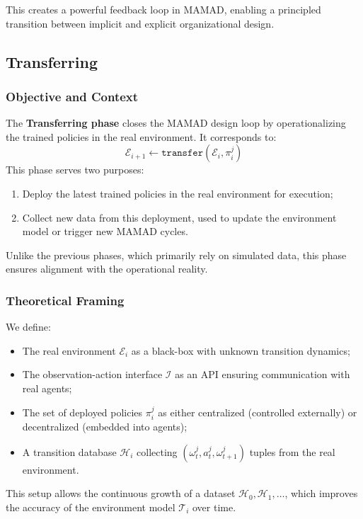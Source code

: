 \documentclass[pdflatex,sn-mathphys-num]{sn-jnl}%
\theoremstyle{thmstyleone}%
\theoremstyle{thmstyletwo}%
\theoremstyle{thmstylethree}%
\begin{document}
This creates a powerful feedback loop in MAMAD, enabling a principled transition between implicit and explicit organizational design.


\subsection{Transferring}

\subsubsection*{Objective and Context}

The \textbf{Transferring phase} closes the MAMAD design loop by operationalizing the trained policies in the real environment. It corresponds to:
\[
\mathcal{E}_{i+1} \gets \texttt{transfer}(\mathcal{E}_i, \pi^j_i)
\]
This phase serves two purposes:
\begin{enumerate}
    \item Deploy the latest trained policies in the real environment for execution;
    \item Collect new data from this deployment, used to update the environment model or trigger new MAMAD cycles.
\end{enumerate}

Unlike the previous phases, which primarily rely on simulated data, this phase ensures alignment with the operational reality.

\subsubsection*{Theoretical Framing}

We define:
\begin{itemize}
    \item The real environment $\mathcal{E}_i$ as a black-box with unknown transition dynamics;
    \item The observation-action interface $\mathcal{I}$ as an API ensuring communication with real agents;
    \item The set of deployed policies $\pi^j_i$ as either centralized (controlled externally) or decentralized (embedded into agents);
    \item A transition database $\mathcal{H}_i$ collecting $(\omega_t^j, a_t^j, \omega_{t+1}^j)$ tuples from the real environment.
\end{itemize}

This setup allows the continuous growth of a dataset $\mathcal{H}_0, \mathcal{H}_1, \ldots$, which improves the accuracy of the environment model $\mathcal{T}_i$ over time.
\end{document}

